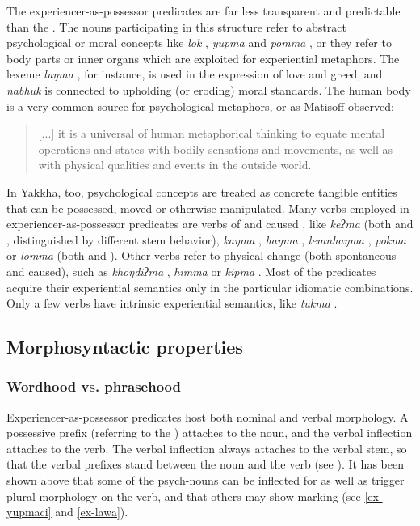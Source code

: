 The experiencer-as-possessor predicates are far less transparent and predictable than the . The nouns participating in this structure refer to abstract psychological or moral concepts like \emph{lok} , \emph{yupma}  and \emph{pomma} , or they refer to body parts or inner organs which are exploited for experiential metaphors. The lexeme \emph{luŋma} , for instance, is used in the expression of love and greed, and \emph{nabhuk}  is connected to upholding (or eroding) moral standards. The human body is a very common source for psychological metaphors, or as  Matisoff observed: 

\begin{quote}
[...] it is a universal of human metaphorical thinking to equate mental operations and states with bodily sensations and movements, as well as with physical qualities and events in the outside world. \citep[9]{Matisoff1986Hearts} 
\end{quote} 

In Yakkha, too, psychological concepts are treated as concrete tangible entities that can be possessed, moved or otherwise manipulated. Many verbs employed in experiencer-as-possessor predicates are verbs of  and caused , like \emph{keʔma} (both  and , distinguished by different stem behavior), \emph{kaŋma} , \emph{haŋma} , \emph{lemnhaŋma} , \emph{pokma}  or \emph{lomma} (both   and ). Other verbs refer to physical change (both spontaneous and caused), such as \emph{khoŋdiʔma} , \emph{himma}  or \emph{kipma} . Most of the predicates acquire their experiential semantics only in the particular idiomatic combinations. Only a few verbs have intrinsic experiential semantics, like \emph{tukma} .


\subsection{Morphosyntactic properties}\label{poss-e2}

\subsubsection{Wordhood vs. phrasehood}

Experiencer-as-possessor predicates host both nominal and verbal morphology. A possessive prefix (referring to the ) attaches to the noun, and the verbal inflection attaches to the verb. The verbal inflection always attaches to the verbal stem, so that the verbal prefixes stand between the noun and the verb (see \Next). It has been shown above that some of the  psych-nouns can  be inflected for  as well as trigger plural morphology on the verb, and that others may show  marking (see \ref{ex-yupmaci} and \ref{ex-lawa}).


